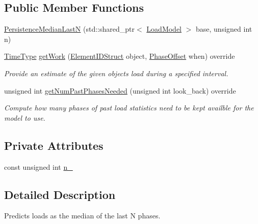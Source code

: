 \subsection*{Public Member Functions}
\begin{DoxyCompactItemize}
\item 
\hyperlink{structvt_1_1vrt_1_1collection_1_1balance_1_1_persistence_median_last_n_afeb915b217785638e82918d6f2b23d8b}{Persistence\+Median\+LastN} (std\+::shared\+\_\+ptr$<$ \hyperlink{structvt_1_1vrt_1_1collection_1_1balance_1_1_load_model}{Load\+Model} $>$ base, unsigned int n)
\item 
\hyperlink{namespacevt_a876a9d0cd5a952859c72de8a46881442}{Time\+Type} \hyperlink{structvt_1_1vrt_1_1collection_1_1balance_1_1_persistence_median_last_n_a905b84cb14c5326bdce4b761e4fd3106}{get\+Work} (\hyperlink{structvt_1_1vrt_1_1collection_1_1balance_1_1_element_i_d_struct}{Element\+I\+D\+Struct} object, \hyperlink{structvt_1_1vrt_1_1collection_1_1balance_1_1_phase_offset}{Phase\+Offset} when) override
\begin{DoxyCompactList}\small\item\em Provide an estimate of the given object\textquotesingle{}s load during a specified interval. \end{DoxyCompactList}\item 
unsigned int \hyperlink{structvt_1_1vrt_1_1collection_1_1balance_1_1_persistence_median_last_n_accad4d2fe2cc3701966e13bbb5dd793c}{get\+Num\+Past\+Phases\+Needed} (unsigned int look\+\_\+back) override
\begin{DoxyCompactList}\small\item\em Compute how many phases of past load statistics need to be kept availble for the model to use. \end{DoxyCompactList}\end{DoxyCompactItemize}
\subsection*{Private Attributes}
\begin{DoxyCompactItemize}
\item 
const unsigned int \hyperlink{structvt_1_1vrt_1_1collection_1_1balance_1_1_persistence_median_last_n_aa800c86e610ba7b4ff0ddf0c91210136}{n\+\_\+}
\end{DoxyCompactItemize}


\subsection{Detailed Description}
Predicts loads as the median of the last N phases. 

